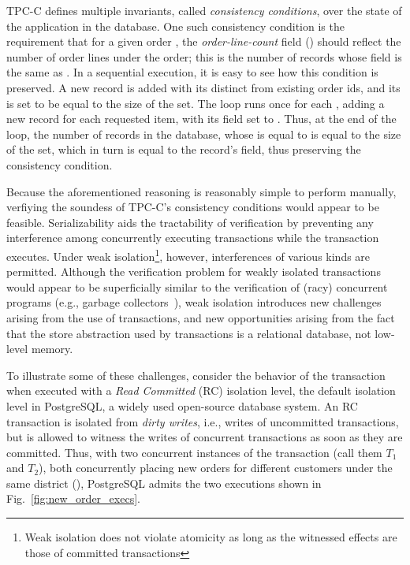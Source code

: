 TPC-C defines multiple invariants, called \emph{consistency
  conditions}, over the state of the application in the database. One
such consistency condition is the requirement that for a given order
, the \emph{order-line-count} field () should
reflect the number of order lines under the order; this is the number
of  records whose  field is the same as
.  In a sequential execution, it is easy to see how this
condition is preserved.  A new  record is added with its
 distinct from existing order ids, and its  is
set to be equal to the size of the  set. The 
loop runs once for each , adding a new 
record for each requested item, with its  field set to
. Thus, at the end of the loop, the number of 
records in the database, whose  is equal to  is
equal to the size of the  set, which in turn is equal to
the  record's  field, thus preserving the
consistency condition.

Because the aforementioned reasoning is reasonably simple to perform
manually, verfiying the soundess of TPC-C's consistency conditions
would appear to be feasible.  Serializability aids the tractability of
verification by preventing any interference among concurrently
executing transactions while the  transaction executes.
Under weak isolation\footnote{Weak isolation does not violate
  atomicity as long as the witnessed effects are those of committed
  transactions}, however, interferences of various kinds are
permitted.  Although the verification problem for weakly isolated
transactions would appear to be superficially similar to the
verification of (racy) concurrent programs (e.g., garbage
collectors~\cite{JLP+14,GHE15,HPQ+15}), weak isolation introduces new
challenges arising from the use of transactions, and new opportunities
arising from the fact that the store abstraction used by transactions
is a relational database, not low-level memory.

To illustrate some of these challenges, consider the behavior of the
 transaction when executed with a \emph{Read Committed}
(RC) isolation level, the default isolation level in PostgreSQL, a
widely used open-source database system.  An RC transaction is
isolated from \emph{dirty writes}, i.e., writes of uncommitted
transactions, but is allowed to witness the writes of concurrent
transactions as soon as they are committed. Thus, with two concurrent
instances of the  transaction (call them $T_1$ and
$T_2$), both concurrently placing new orders for different customers
under the same district (), PostgreSQL admits the two
executions shown in Fig.~\ref{fig:new_order_execs}.

